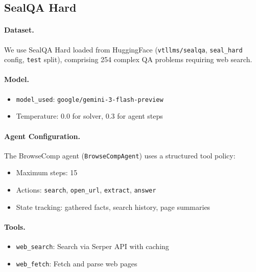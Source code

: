 \documentclass{article}
\theoremstyle{plain}
\theoremstyle{definition}
\theoremstyle{remark}
\begin{document}
\subsection{SealQA Hard}
\label{app:sealqa}

\paragraph{Dataset.}
We use SealQA Hard \cite{pham2025sealqa} loaded from HuggingFace (\texttt{vtllms/sealqa}, \texttt{seal\_hard} config, \texttt{test} split), comprising 254 complex QA problems requiring web search.

\paragraph{Model.}
\begin{itemize}
    \item \texttt{model\_used}: \texttt{google/gemini-3-flash-preview}
    \item Temperature: 0.0 for solver, 0.3 for agent steps
\end{itemize}

\paragraph{Agent Configuration.}
The BrowseComp agent (\texttt{BrowseCompAgent}) uses a structured tool policy:
\begin{itemize}
    \item Maximum steps: 15
    \item Actions: \texttt{search}, \texttt{open\_url}, \texttt{extract}, \texttt{answer}
    \item State tracking: gathered facts, search history, page summaries
\end{itemize}

\paragraph{Tools.}
\begin{itemize}
    \item \texttt{web\_search}: Search via Serper API with caching
    \item \texttt{web\_fetch}: Fetch and parse web pages
\end{itemize}
\end{document}
